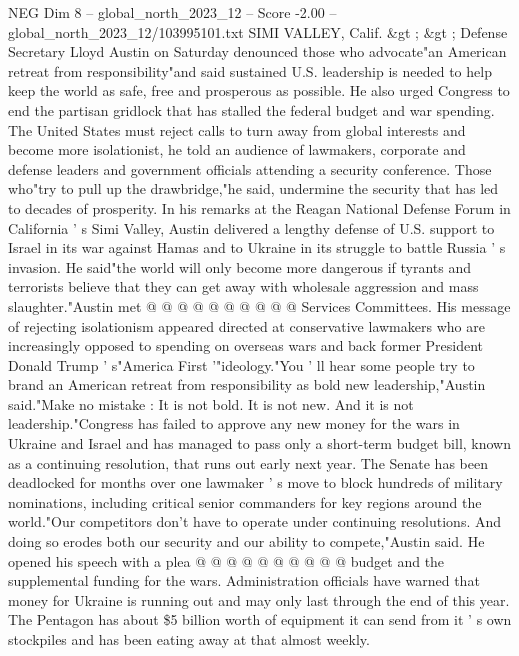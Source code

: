 \begin{textsample}{NEG Dim 8 – global\_north\_2023\_12 – Score -2.00 – global\_north\_2023\_12/103995101.txt}  \label{ex:f8_neg_170}
SIMI VALLEY, Calif. \&gt ; \&gt ; Defense Secretary Lloyd Austin on Saturday denounced those who advocate"an American retreat from responsibility"and said sustained U.S. leadership is needed to help keep the world as safe, free and prosperous as possible.
He also urged Congress to end the partisan gridlock that has stalled the federal budget and war spending.
The United States must reject calls to turn away from global interests and become more isolationist, he told an audience of lawmakers, corporate and defense leaders and government officials attending a security conference.
Those who"try to pull up the drawbridge,"he said, undermine the security that has led to decades of prosperity.
In his remarks at the Reagan National Defense Forum in California ' s Simi Valley, Austin delivered a lengthy defense of U.S. support to Israel in its war against Hamas and to Ukraine in its struggle to battle Russia ' s invasion.
He said"the world will only become more dangerous if tyrants and terrorists believe that they can get away with wholesale aggression and mass slaughter."Austin met @ @ @ @ @ @ @ @ @ @ Services Committees.
His message of rejecting isolationism appeared directed at conservative lawmakers who are increasingly opposed to spending on overseas wars and back former President Donald Trump ' s"America First '"ideology."You ' ll hear some people try to brand an American retreat from responsibility as bold new leadership,"Austin said."Make no mistake : It is not bold.
It is not new.
And it is not leadership."Congress has failed to approve any new money for the wars in Ukraine and Israel and has managed to pass only a short-term budget bill, known as a continuing resolution, that runs out early next year.
The Senate has been deadlocked for months over one lawmaker ' s move to block hundreds of military nominations, including critical senior commanders for key regions around the world."Our competitors don't have to operate under continuing resolutions.
And doing so erodes both our security and our ability to compete,"Austin said.
He opened his speech with a plea @ @ @ @ @ @ @ @ @ @ budget and the supplemental funding for the wars.
Administration officials have warned that money for Ukraine is running out and may only last through the end of this year.
The Pentagon has about \$5 billion worth of equipment it can send from it ' s own stockpiles and has been eating away at that almost weekly.

\end{textsample}
